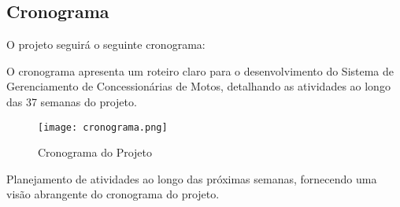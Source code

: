 \subsection{Cronograma}

O projeto seguirá o seguinte cronograma:

O cronograma apresenta um roteiro claro para o desenvolvimento do Sistema de Gerenciamento de Concessionárias de Motos, detalhando as atividades ao longo das 37 semanas do projeto.

\begin{figure}[h]
	\centering
	\texttt{[image: cronograma.png]}
	\caption{Cronograma do Projeto}
	\label{fig:cronograma}
\end{figure}

Planejamento de atividades ao longo das próximas semanas, fornecendo uma visão abrangente do cronograma do projeto.
